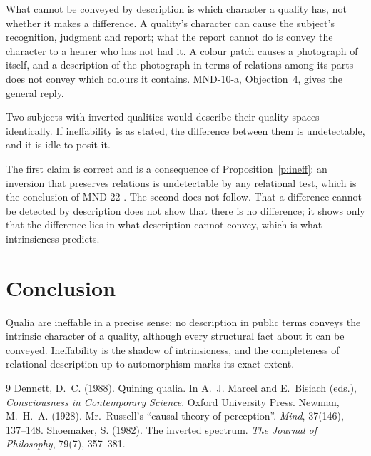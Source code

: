 \documentclass{situationist-preprint}
\begin{document}
\begin{reply}
What cannot be conveyed by description is which character a quality has, not whether it makes a difference. A quality's character can cause the subject's recognition, judgment and report; what the report cannot do is convey the character to a hearer who has not had it. A colour patch causes a photograph of itself, and a description of the photograph in terms of relations among its parts does not convey which colours it contains. MND-10-a, Objection~4, gives the general reply.
\end{reply}

\begin{objection}
Two subjects with inverted qualities would describe their quality spaces identically. If ineffability is as stated, the difference between them is undetectable, and it is idle to posit it.
\end{objection}

\begin{reply}
The first claim is correct and is a consequence of Proposition~\ref{p:ineff}: an inversion that preserves relations is undetectable by any relational test, which is the conclusion of MND-22 \citep{Shoemaker1982}. The second does not follow. That a difference cannot be detected by description does not show that there is no difference; it shows only that the difference lies in what description cannot convey, which is what intrinsicness predicts.
\end{reply}

\section{Conclusion}

Qualia are ineffable in a precise sense: no description in public terms conveys the intrinsic character of a quality, although every structural fact about it can be conveyed. Ineffability is the shadow of intrinsicness, and the completeness of relational description up to automorphism marks its exact extent.

\begin{thebibliography}{9}\small
{} Dennett, D.~C. (1988). Quining qualia. In A.~J. Marcel and E.~Bisiach (eds.), \emph{Consciousness in Contemporary Science}. Oxford University Press.
 Newman, M.~H.~A. (1928). Mr.\ Russell's \enquote{causal theory of perception}. \emph{Mind}, 37(146), 137--148.
 Shoemaker, S. (1982). The inverted spectrum. \emph{The Journal of Philosophy}, 79(7), 357--381.
\end{thebibliography}
\end{document}

